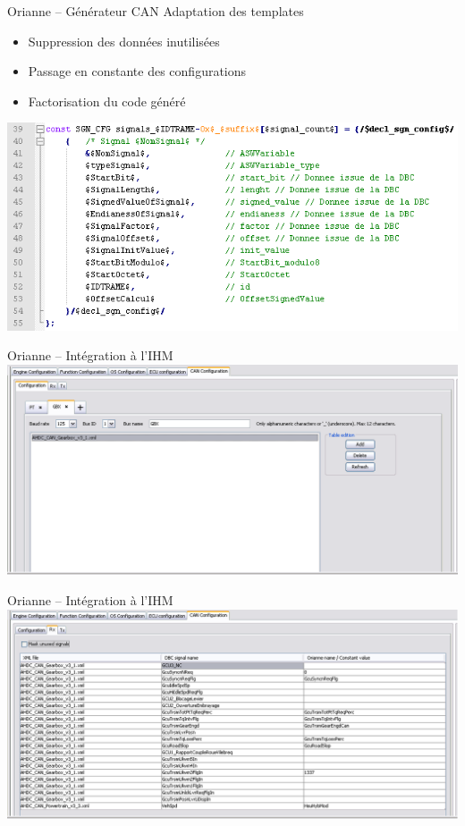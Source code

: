 \documentclass[xcolor=x11names,compress]{beamer}
\begin{document}
\begin{frame}{Orianne -- Générateur CAN}
  Adaptation des templates
  \begin{itemize}
	\item Suppression des données inutilisées
	\item Passage en constante des configurations
	\item Factorisation du code généré
  \end{itemize}
  \vfill
  \centering
  \includegraphics[scale=0.35]{images/template_can}
\end{frame}

\begin{frame}{Orianne -- Intégration à l'IHM}
  \centering
  \includegraphics[scale=0.3]{images/ihmcan_conf}
\end{frame}

\begin{frame}{Orianne -- Intégration à l'IHM}
  \centering
  \includegraphics[scale=0.3]{images/ihmcan_signal}
\end{frame}
\end{document}
